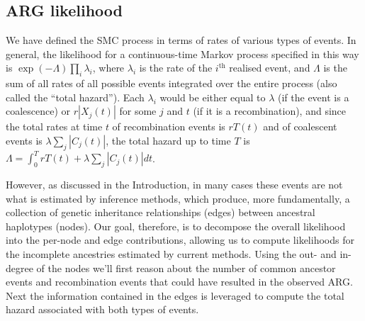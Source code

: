 \documentclass{article}
\newcommand{\comment}[1]{{\it \color{orange} (#1)}}
\begin{document}
\subsection*{ARG likelihood} \label{par:liks}
We have defined the SMC process in terms of rates of various types of events.
In general, the likelihood for a continuous-time Markov process specified in this way
is $\exp(-\Lambda) \prod_i \lambda_i$, 
where $\lambda_i$ is the rate of the $i^\text{th}$ realised event,
and $\Lambda$ is the sum of all rates of all possible events
integrated over the entire process
(also called the ``total hazard'').
Each $\lambda_i$ would be either equal to $\lambda$ (if the event is a coalescence)
or $r|X_j(t)|$ for some $j$ and $t$ (if it is a recombination),
and since the total rates at time $t$ of recombination events is $rT(t)$
and of coalescent events is $\lambda \sum_j |C_j(t)|$,
the total hazard up to time $T$ is $\Lambda = \int_0^T r T(t) + \lambda \sum_j |C_j(t)| dt$.

However,
as discussed in the Introduction, in many cases these events are not what is
estimated by inference methods, which produce, more fundamentally, a collection
of genetic inheritance relationships (edges) between ancestral haplotypes (nodes).
Our goal, therefore, is to decompose the overall likelihood into the
per-node and edge contributions, allowing us to compute likelihoods
for the incomplete ancestries estimated by current methods.
Using the out- and in-degree of the nodes we'll first reason about the number
of common ancestor events and recombination events that could have resulted in
the observed ARG. Next the information contained in the edges is leveraged to
compute the total hazard associated with both types of events.


\end{document}
